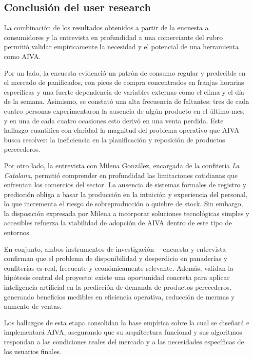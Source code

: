\subsection{Conclusión del user research}

La combinación de los resultados obtenidos a partir de la encuesta a consumidores y la entrevista en profundidad a una comerciante del rubro permitió validar empíricamente la necesidad y el potencial de una herramienta como AIVA.  

\indent Por un lado, la encuesta evidenció un patrón de consumo regular y predecible en el mercado de panificados, con picos de compra concentrados en franjas horarias específicas y una fuerte dependencia de variables externas como el clima y el día de la semana. Asimismo, se constató una alta frecuencia de faltantes: tres de cada cuatro personas experimentaron la ausencia de algún producto en el último mes, y en una de cada cuatro ocasiones esto derivó en una venta perdida. Este hallazgo cuantifica con claridad la magnitud del problema operativo que AIVA busca resolver: la ineficiencia en la planificación y reposición de productos perecederos.  

\indent Por otro lado, la entrevista con Milena González, encargada de la confitería \textit{La Catalana}, permitió comprender en profundidad las limitaciones cotidianas que enfrentan los comercios del sector. La ausencia de sistemas formales de registro y predicción obliga a basar la producción en la intuición y experiencia del personal, lo que incrementa el riesgo de sobreproducción o quiebre de stock. Sin embargo, la disposición expresada por Milena a incorporar soluciones tecnológicas simples y accesibles refuerza la viabilidad de adopción de AIVA dentro de este tipo de entornos.  

\indent En conjunto, ambos instrumentos de investigación —encuesta y entrevista— confirman que el problema de disponibilidad y desperdicio en panaderías y confiterías es real, frecuente y económicamente relevante. Además, validan la hipótesis central del proyecto: existe una oportunidad concreta para aplicar inteligencia artificial en la predicción de demanda de productos perecederos, generando beneficios medibles en eficiencia operativa, reducción de mermas y aumento de ventas.  

\indent Los hallazgos de esta etapa consolidan la base empírica sobre la cual se diseñará e implementará AIVA, asegurando que su arquitectura funcional y sus algoritmos respondan a las condiciones reales del mercado y a las necesidades específicas de los usuarios finales.

